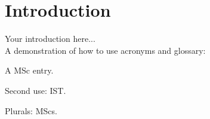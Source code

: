 
\chapter{Introduction}
\label{chapter:introduction}
Your introduction here...\\

A demonstration of how to use acronyms and glossary:

A \gls{MSc} entry.

Second use: \gls{IST}.

Plurals: \glspl{MSc}.
